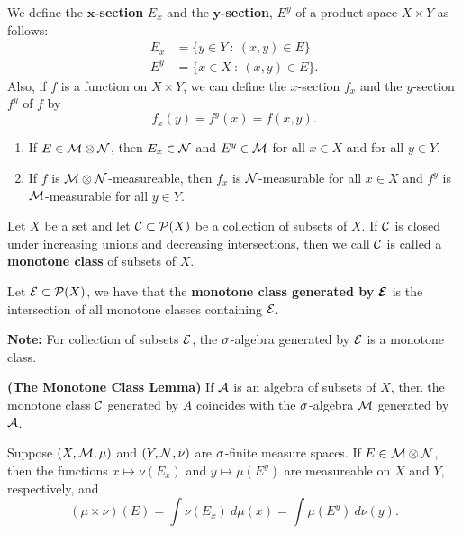 \vs

\dfn We define the $\boldsymbol{x}$\textbf{-section} $E_x$ and the $\boldsymbol{y}$\textbf{-section}, $E^y$ of a product space $X\times Y$ as follows:
\begin{align*}
     E_x &= \{y\in Y\ :\ (x,y) \in E\}\\
     E^y &= \{x\in X\ :\ (x,y) \in E\}.
\end{align*}
Also, if $f$ is a function on $X\times Y$, we can define the $x$-section $f_x$ and the $y$-section $f^y$ of $f$ by 
\[f_x(y) = f^y(x) = f(x, y).\]

\vs

\begin{prop}\nl
\begin{enumerate}
    \item If $E\in \mathcal{M}\otimes \mathcal{N}$, then $E_x\in \mathcal{N}$ and $E^y\in \mathcal{M}$ for all $x\in X$ and for all $y\in Y$.
    \item If $f$ is $\mathcal{M}\otimes \mathcal{N}$-measureable, then $f_x$ is $\mathcal{N}$-measurable for all $x\in X$ and $f^y$ is $\mathcal{M}$-measurable for all $y\in Y$.
\end{enumerate}
\end{prop}

\vs

\dfn Let $X$ be a set and let $\mathcal{C}\subset \mathcal{P}(X)$ be a collection of subsets of $X$. If $\mathcal{C}$ is closed under increasing unions and decreasing intersections, then we call $\mathcal{C}$ is called a \textbf{monotone class} of subsets of $X$.

\vs

\dfn Let $\mathcal{E} \subset \mathcal{P}(X)$, we have that the \textbf{monotone class generated by }$\boldsymbol{\mathcal{E}}$ is the intersection of all monotone classes containing $\mathcal{E}$.

\vs

\textbf{Note:} For collection of subsets $\mathcal{E}$, the $\sigma$-algebra generated by $\mathcal{E}$ is a monotone class.

\vs

\begin{thm}\textbf{(The Monotone Class Lemma)}
If $\mathcal{A}$ is an algebra of subsets of $X$, then the monotone class $\mathcal{C}$ generated by $A$ coincides with the $\sigma$-algebra $\mathcal{M}$ generated by $\mathcal{A}$.
\end{thm}

\vs

\begin{thm}
Suppose $(X, \mathcal{M}, \mu)$ and $(Y, \mathcal{N}, \nu)$ are $\sigma$-finite measure spaces. If $E\in \mathcal{M}\otimes \mathcal{N}$, then the functions $x\mapsto \nu(E_x)$ and $y\mapsto \mu(E^y)$ are measureable on $X$ and $Y$, respectively, and
\[(\mu\times\nu)(E) = \int \nu(E_x)\ d\mu(x) = \int \mu(E^y)\ d\nu(y).\]
\end{thm}

